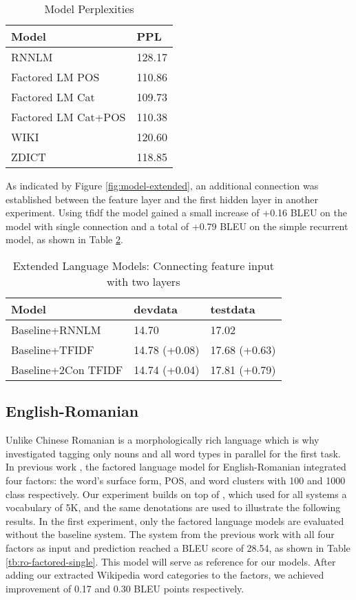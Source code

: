 \documentclass[a4paper]{article}
\begin{document}
\begin{table} 
  \caption{Model Perplexities}
  \centering
  \begin{tabular}{ ll}
  	\hline
  	Model               & PPL    \\ \hline\hline
  	RNNLM               & 128.17 \\ \hline
  	Factored LM POS     & 110.86 \\
  	Factored LM Cat     & 109.73 \\
  	Factored LM Cat+POS & 110.38 \\ \hline
  	WIKI                & 120.60 \\
  	ZDICT               & 118.85 \\ \hline
  \end{tabular}
  \label{tb:PPL}
\end{table}


As indicated by Figure \ref{fig:model-extended}, an additional connection was established between the feature layer and the first hidden layer in another experiment. Using tfidf the model gained a small increase of +0.16 BLEU on the model with single connection and a total of +0.79 BLEU on the simple recurrent model, as shown in Table \ref{tb:zh-extended-both}.


\begin{table}
\caption{Extended Language Models: Connecting feature input with two layers}
\centering
  \begin{tabular}{lll}
  	\hline
  	Model               & devdata       & testdata      \\ \hline\hline
  	Baseline+RNNLM      & 14.70         & 17.02         \\ \hline
  	Baseline+TFIDF      & 14.78 (+0.08) & 17.68 (+0.63) \\
  	Baseline+2Con TFIDF & 14.74 (+0.04) & 17.81 (+0.79)
  \end{tabular}
  \label{tb:zh-extended-both}
\end{table}


\subsection{English-Romanian}
Unlike Chinese Romanian is a morphologically rich language which is why investigated tagging only nouns and all word types in parallel for the first task. 
In previous work \cite{niehuesusing}, the factored language model for English-Romanian integrated four factors: the word's surface form, POS, and word clusters with 100 and 1000 class respectively. Our experiment builds on top of \cite{niehuesusing}, which used for all systems a vocabulary of 5K, and the same denotations are used to illustrate the following results. In the first experiment, only the factored language models are evaluated without the baseline system. The system from the previous work with all four factors as input and prediction reached a BLEU score of 28.54, as shown in Table \ref{tb:ro-factored-single}. This model will serve as reference for our models. After adding our extracted Wikipedia word categories to the factors, we achieved improvement of 0.17 and 0.30 BLEU points respectively.
\end{document}
